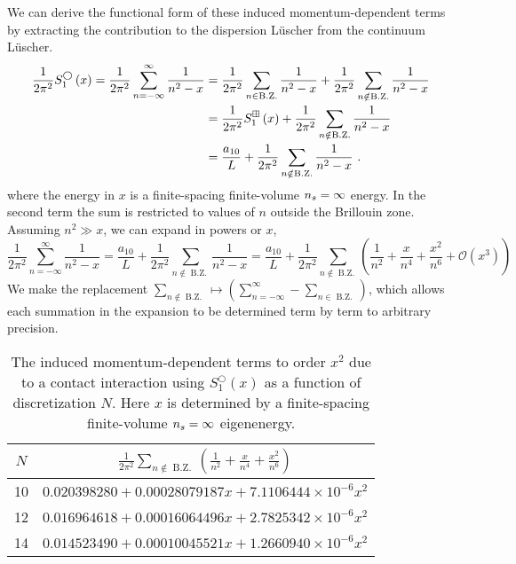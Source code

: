 We can derive the functional form of these induced momentum-dependent terms by extracting the contribution to the dispersion L\"uscher from the continuum L\"uscher.
\begin{align*}
 \frac{1}{2 \pi^{2}} S^\bigcirc_{1}\left(x\right)=\frac{1}{2 \pi^{2}} \sum_{n=-\infty}^{\infty} \frac{1}{n^{2}-x} &=\frac{1}{2 \pi^{2}} \sum_{n\in \operatorname{B.Z.}} \frac{1}{n^{2}-x} +\frac{1}{2 \pi^{2}} \sum_{n\notin \operatorname{B.Z.}} \frac{1}{n^{2}-x} \\
 &= \frac{1}{2 \pi^{2}} S^{\boxplus}_{1}\left(x\right)+\frac{1}{2 \pi^{2}} \sum_{n\notin \operatorname{B.Z.}} \frac{1}{n^{2}-x}\\
&=\frac{a_{10}}{L}+\frac{1}{2 \pi^{2}} \sum_{n\notin \operatorname{B.Z.}} \frac{1}{n^{2}-x} \ .
\end{align*}
where the energy in $x$ is a finite-spacing finite-volume ${n_s}=\infty$ energy.
In the second term the sum is restricted to values of $n$ outside the Brillouin zone.
Assuming $n^2\gg x$, we can expand in powers or $x$,
\begin{equation}
    \frac{1}{2 \pi^{2}} \sum_{n=-\infty}^{\infty} \frac{1}{n^{2}-x}
        =
    \frac{a_{10}}{L}+\frac{1}{2 \pi^{2}} \sum_{n\notin \operatorname{B.Z.}} \frac{1}{n^{2}-x}
        =
    \frac{a_{10}}{L}+\frac{1}{2 \pi^{2}} \sum_{n\notin \operatorname{B.Z.}} \left(\frac{1}{n^2}+\frac{x}{n^4}+\frac{x^2}{n^6}+\mathcal{O}(x^3)\right)
\end{equation}
We make the replacement $\sum_{n\notin\operatorname{B.Z.}}\mapsto\left(\sum_{n=-\infty}^\infty-\sum_{n\in\operatorname{B.Z.}}\right)$, which allows each summation in the expansion to be determined term by term to arbitrary precision.

\begin{table}
    \caption{
    The induced momentum-dependent terms to order $x^2$ due to a contact interaction using $S^\bigcirc_1(x)$ as a function of discretization $N$.
    Here $x$ is determined by a finite-spacing finite-volume ${n_s}=\infty$ eigenenergy.}
    \label{tab:induced terms in 1 d}
    \begin{tabular}{c|c}
    $N$
        &
            $\frac{1}{2 \pi^{2}} \sum_{n\notin \operatorname{B.Z.}} \left(\frac{1}{n^2}+\frac{x}{n^4}+\frac{x^2}{n^6}\right)$       \\
        \hline
    10  &   $0.020398280 + 0.00028079187 x + 7.1106444\times10^{-6} x^2$    \\
    12  &   $0.016964618 + 0.00016064496 x + 2.7825342\times10^{-6} x^2$    \\
    14  &   $0.014523490 + 0.00010045521 x + 1.2660940\times10^{-6} x^2$    \\
    \end{tabular}
\end{table}


